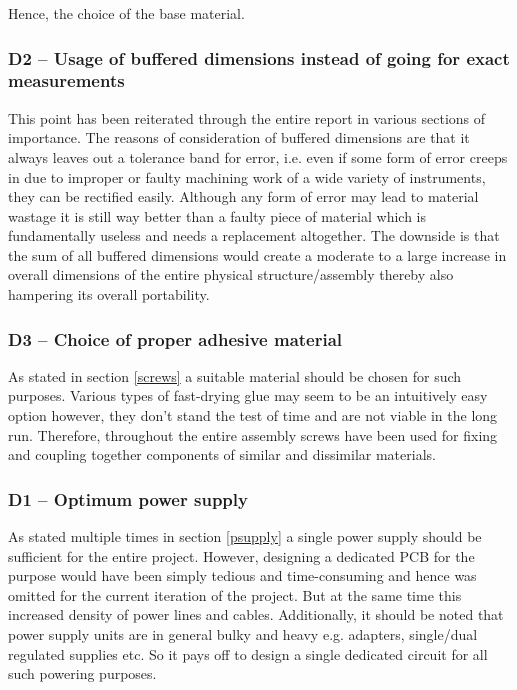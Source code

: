 Hence, the choice of the base material.

\subsubsection*{D2 – Usage of buffered dimensions instead of going for exact measurements}

This point has been reiterated through the entire report in various sections of importance. The reasons of consideration of buffered dimensions are that it always leaves out a tolerance band for error, i.e. even if some form of error creeps in due to improper or faulty machining work of a wide variety of instruments, they can be rectified easily. Although any form of error may lead to material wastage it is still way better than a faulty piece of material which is fundamentally useless and needs a replacement altogether. The downside is that the sum of all buffered dimensions would create a moderate to a large increase in overall dimensions of the entire physical structure/assembly thereby also hampering its overall portability.

\subsubsection*{D3 – Choice of proper adhesive material}

As stated in section \ref{screws} a suitable material should be chosen for such purposes. Various types of fast-drying glue may seem to be an intuitively easy option however, they don’t stand the test of time and are not viable in the long run. Therefore, throughout the entire assembly screws have been used for fixing and coupling together components of similar and dissimilar materials.

\subsubsection*{D1 – Optimum power supply}

As stated multiple times in section \ref{psupply} a single power supply should be sufficient for the entire project. However, designing a dedicated PCB for the purpose would have been simply tedious and time-consuming and hence was omitted for the current iteration of the project. But at the same time this increased density of power lines and cables. Additionally, it should be noted that power supply units are in general bulky and heavy e.g. adapters, single/dual regulated supplies etc. So it pays off to design a single dedicated circuit for all such powering purposes.


